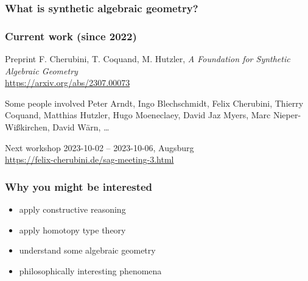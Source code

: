 \documentclass[aspectratio=1610]{beamer}
\begin{document}
\begin{frame}
  \frametitle{What is synthetic algebraic geometry?}

  \center%
\end{frame}

\begin{frame}
  \frametitle{Current work (since 2022)}

  \begin{block}{Preprint}
    F. Cherubini, T. Coquand, M. Hutzler,
    \textit{A Foundation for Synthetic Algebraic Geometry}\\
    \url{https://arxiv.org/abs/2307.00073}
  \end{block}

  \begin{block}{Some people involved}
    Peter Arndt,
    Ingo Blechschmidt,
    Felix Cherubini,
    Thierry Coquand,
    Matthias Hutzler,
    Hugo Moeneclaey,
    David Jaz Myers,
    Marc Nieper-Wißkirchen,
    David Wärn,
    \dots
  \end{block}

  \begin{block}{Next workshop}
    2023-10-02 -- 2023-10-06, Augsburg\\
    \url{https://felix-cherubini.de/sag-meeting-3.html}
  \end{block}
\end{frame}

\begin{frame}
  \frametitle{Why \alert{you} might be interested}

  \begin{itemize}
    \item
      apply constructive reasoning
    \item
      apply homotopy type theory
    \item
      understand some algebraic geometry
    \item
      philosophically interesting phenomena
  \end{itemize}

  \bigskip
  \bigskip
\end{frame}
\end{document}
